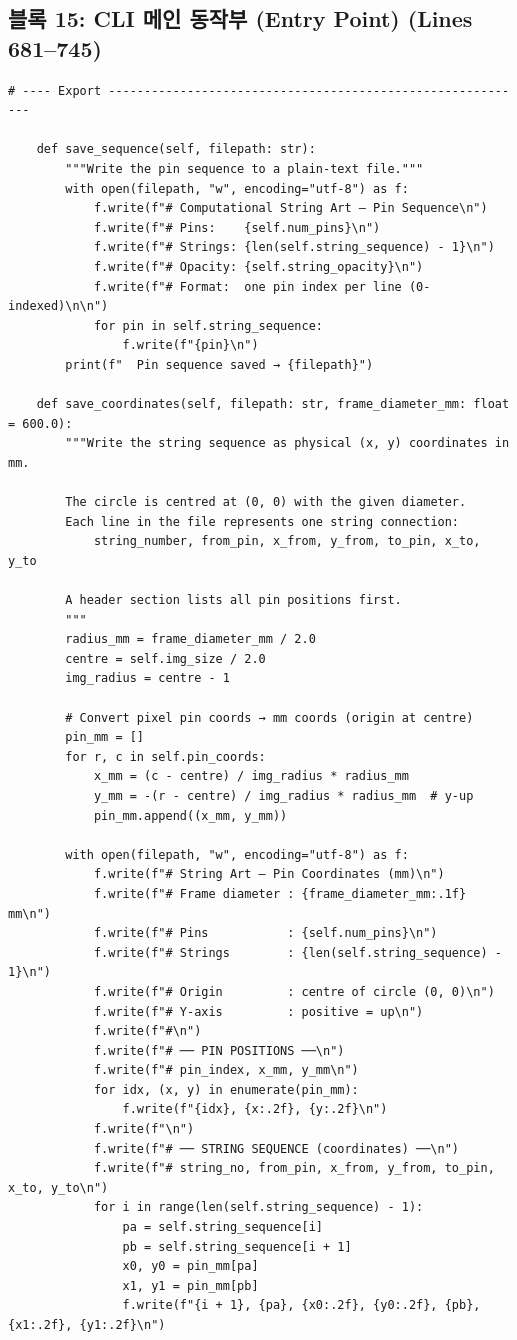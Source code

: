\subsection*{블록 15: CLI 메인 동작부 (Entry Point) (Lines 681--745)}
\begin{lstlisting}[firstnumber=681]
    # ---- Export -----------------------------------------------------------

    def save_sequence(self, filepath: str):
        """Write the pin sequence to a plain-text file."""
        with open(filepath, "w", encoding="utf-8") as f:
            f.write(f"# Computational String Art – Pin Sequence\n")
            f.write(f"# Pins:    {self.num_pins}\n")
            f.write(f"# Strings: {len(self.string_sequence) - 1}\n")
            f.write(f"# Opacity: {self.string_opacity}\n")
            f.write(f"# Format:  one pin index per line (0-indexed)\n\n")
            for pin in self.string_sequence:
                f.write(f"{pin}\n")
        print(f"  Pin sequence saved → {filepath}")

    def save_coordinates(self, filepath: str, frame_diameter_mm: float = 600.0):
        """Write the string sequence as physical (x, y) coordinates in mm.

        The circle is centred at (0, 0) with the given diameter.
        Each line in the file represents one string connection:
            string_number, from_pin, x_from, y_from, to_pin, x_to, y_to

        A header section lists all pin positions first.
        """
        radius_mm = frame_diameter_mm / 2.0
        centre = self.img_size / 2.0
        img_radius = centre - 1

        # Convert pixel pin coords → mm coords (origin at centre)
        pin_mm = []
        for r, c in self.pin_coords:
            x_mm = (c - centre) / img_radius * radius_mm
            y_mm = -(r - centre) / img_radius * radius_mm  # y-up
            pin_mm.append((x_mm, y_mm))

        with open(filepath, "w", encoding="utf-8") as f:
            f.write(f"# String Art – Pin Coordinates (mm)\n")
            f.write(f"# Frame diameter : {frame_diameter_mm:.1f} mm\n")
            f.write(f"# Pins           : {self.num_pins}\n")
            f.write(f"# Strings        : {len(self.string_sequence) - 1}\n")
            f.write(f"# Origin         : centre of circle (0, 0)\n")
            f.write(f"# Y-axis         : positive = up\n")
            f.write(f"#\n")
            f.write(f"# ── PIN POSITIONS ──\n")
            f.write(f"# pin_index, x_mm, y_mm\n")
            for idx, (x, y) in enumerate(pin_mm):
                f.write(f"{idx}, {x:.2f}, {y:.2f}\n")
            f.write(f"\n")
            f.write(f"# ── STRING SEQUENCE (coordinates) ──\n")
            f.write(f"# string_no, from_pin, x_from, y_from, to_pin, x_to, y_to\n")
            for i in range(len(self.string_sequence) - 1):
                pa = self.string_sequence[i]
                pb = self.string_sequence[i + 1]
                x0, y0 = pin_mm[pa]
                x1, y1 = pin_mm[pb]
                f.write(f"{i + 1}, {pa}, {x0:.2f}, {y0:.2f}, {pb}, {x1:.2f}, {y1:.2f}\n")


\end{lstlisting}
